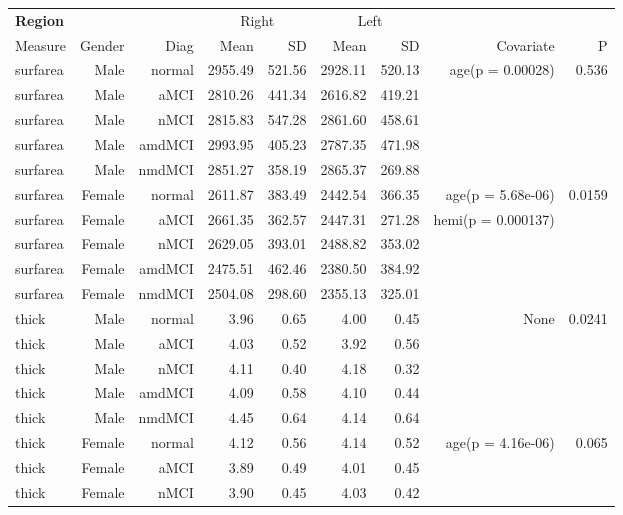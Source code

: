 \documentclass[12pt]{article}
\newcommand\T{\rule{0pt}{2.6ex}}
\newcommand\B{\rule[-1.2ex]{0pt}{0pt}}
\begin{document}
  \newpage
\begin{sidewaystable}
  \centering
  \footnotesize
	\begin{tabular}{l|rr|rr|rr|rr}
	\hline
	\textbf{Region} & & & \multicolumn{2}{c}{Right} \T & \multicolumn{2}{|c}{Left} & & \\
	\multicolumn{1}{l|}{Measure} \T\B & Gender & Diag & Mean & SD & Mean & SD & Covariate & P \\
	\hline\hline
 surfarea & Male & normal & 2955.49 & 521.56 & 2928.11 & 520.13 & age(p = 0.00028) & 0.536 \\ 
  surfarea & Male & aMCI & 2810.26 & 441.34 & 2616.82 & 419.21 &  &  \\ 
  surfarea & Male & nMCI & 2815.83 & 547.28 & 2861.60 & 458.61 &  &  \\ 
  surfarea & Male & amdMCI & 2993.95 & 405.23 & 2787.35 & 471.98 &  &  \\ 
  surfarea & Male & nmdMCI & 2851.27 & 358.19 & 2865.37 & 269.88 &  &  \\ 
   \hline
surfarea & Female & normal & 2611.87 & 383.49 & 2442.54 & 366.35 & age(p = 5.68e-06) & 0.0159 \\ 
  surfarea & Female & aMCI & 2661.35 & 362.57 & 2447.31 & 271.28 & hemi(p = 0.000137) &  \\ 
  surfarea & Female & nMCI & 2629.05 & 393.01 & 2488.82 & 353.02 &  &  \\ 
  surfarea & Female & amdMCI & 2475.51 & 462.46 & 2380.50 & 384.92 &  &  \\ 
  surfarea & Female & nmdMCI & 2504.08 & 298.60 & 2355.13 & 325.01 &  &  \\ 
   \hline
thick & Male & normal & 3.96 & 0.65 & 4.00 & 0.45 & None & 0.0241 \\ 
  thick & Male & aMCI & 4.03 & 0.52 & 3.92 & 0.56 &  &  \\ 
  thick & Male & nMCI & 4.11 & 0.40 & 4.18 & 0.32 &  &  \\ 
  thick & Male & amdMCI & 4.09 & 0.58 & 4.10 & 0.44 &  &  \\ 
  thick & Male & nmdMCI & 4.45 & 0.64 & 4.14 & 0.64 &  &  \\ 
   \hline
thick & Female & normal & 4.12 & 0.56 & 4.14 & 0.52 & age(p = 4.16e-06) & 0.065 \\ 
  thick & Female & aMCI & 3.89 & 0.49 & 4.01 & 0.45 &  &  \\ 
  thick & Female & nMCI & 3.90 & 0.45 & 4.03 & 0.42 &  &  \\ 

\end{tabular}
\end{sidewaystable}
\end{document}
